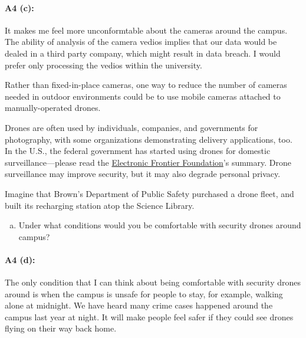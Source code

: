 \paragraph{A4 (c):} It makes me feel more unconformtable about the cameras around the campus. The ability of analysis of the camera vedios implies that our data would be dealed in a third party company, which might result in data breach. I would prefer only processing the vedios within the university.


\newpage
Rather than fixed-in-place cameras, one way to reduce the number of cameras needed in outdoor environments could be to use mobile cameras attached to manually-operated drones. 

Drones are often used by individuals, companies, and governments for photography, with some organizations demonstrating delivery applications, too. In the U.S., the federal government has started using drones for domestic surveillance---please read the \href{https://www.eff.org/issues/surveillance-drones}{Electronic Frontier Foundation}'s summary. Drone surveillance may improve security, but it may also degrade personal privacy.


Imagine that Brown's Department of Public Safety purchased a drone fleet, and built its recharging station atop the Science Library. 

\begin{enumerate}[(d)]
    \item Under what conditions would you be comfortable with security drones around campus?
\end{enumerate}

\paragraph{A4 (d):} The only condition that I can think about being comfortable with security drones around is when the campus is unsafe for people to stay, for example, walking alone at midnight. We have heard many crime cases happened around the campus last year at night. It will make people feel safer if they could see drones flying on their way back home.




